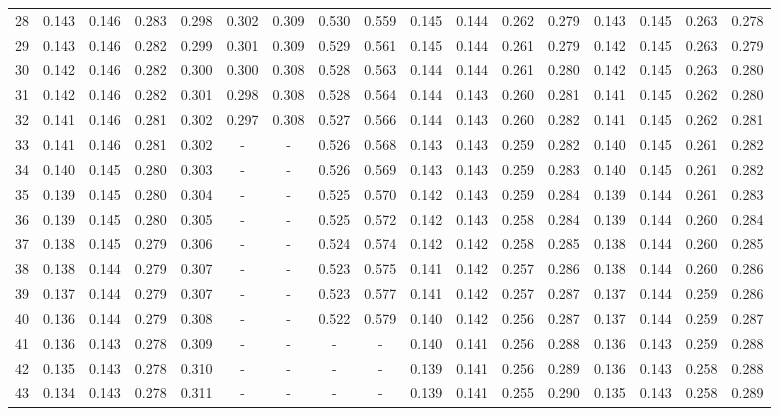 \documentclass{report}
\begin{document}
\begin{appendices}
\begin{table}
\begin{tabular}{|c|cccc|cccc|cccc|cccc|}
28 & 0.143 & 0.146 & 0.283 & 0.298 & 0.302 & 0.309 & 0.530 & 0.559 & 0.145 & 0.144 & 0.262 & 0.279 & 0.143 & 0.145 & 0.263 & 0.278\\
29 & 0.143 & 0.146 & 0.282 & 0.299 & 0.301 & 0.309 & 0.529 & 0.561 & 0.145 & 0.144 & 0.261 & 0.279 & 0.142 & 0.145 & 0.263 & 0.279\\
30 & 0.142 & 0.146 & 0.282 & 0.300 & 0.300 & 0.308 & 0.528 & 0.563 & 0.144 & 0.144 & 0.261 & 0.280 & 0.142 & 0.145 & 0.263 & 0.280\\
31 & 0.142 & 0.146 & 0.282 & 0.301 & 0.298 & 0.308 & 0.528 & 0.564 & 0.144 & 0.143 & 0.260 & 0.281 & 0.141 & 0.145 & 0.262 & 0.280\\
32 & 0.141 & 0.146 & 0.281 & 0.302 & 0.297 & 0.308 & 0.527 & 0.566 & 0.144 & 0.143 & 0.260 & 0.282 & 0.141 & 0.145 & 0.262 & 0.281\\
33 & 0.141 & 0.146 & 0.281 & 0.302 &   -   &   -   & 0.526 & 0.568 & 0.143 & 0.143 & 0.259 & 0.282 & 0.140 & 0.145 & 0.261 & 0.282\\
34 & 0.140 & 0.145 & 0.280 & 0.303 &   -   &   -   & 0.526 & 0.569 & 0.143 & 0.143 & 0.259 & 0.283 & 0.140 & 0.145 & 0.261 & 0.282\\
35 & 0.139 & 0.145 & 0.280 & 0.304 &   -   &   -   & 0.525 & 0.570 & 0.142 & 0.143 & 0.259 & 0.284 & 0.139 & 0.144 & 0.261 & 0.283\\
36 & 0.139 & 0.145 & 0.280 & 0.305 &   -   &   -   & 0.525 & 0.572 & 0.142 & 0.143 & 0.258 & 0.284 & 0.139 & 0.144 & 0.260 & 0.284\\
37 & 0.138 & 0.145 & 0.279 & 0.306 &   -   &   -   & 0.524 & 0.574 & 0.142 & 0.142 & 0.258 & 0.285 & 0.138 & 0.144 & 0.260 & 0.285\\
38 & 0.138 & 0.144 & 0.279 & 0.307 &   -   &   -   & 0.523 & 0.575 & 0.141 & 0.142 & 0.257 & 0.286 & 0.138 & 0.144 & 0.260 & 0.286\\
39 & 0.137 & 0.144 & 0.279 & 0.307 &   -   &   -   & 0.523 & 0.577 & 0.141 & 0.142 & 0.257 & 0.287 & 0.137 & 0.144 & 0.259 & 0.286\\
40 & 0.136 & 0.144 & 0.279 & 0.308 &   -   &   -   & 0.522 & 0.579 & 0.140 & 0.142 & 0.256 & 0.287 & 0.137 & 0.144 & 0.259 & 0.287\\
41 & 0.136 & 0.143 & 0.278 & 0.309 &   -   &   -   &   -   &   -   & 0.140 & 0.141 & 0.256 & 0.288 & 0.136 & 0.143 & 0.259 & 0.288\\
42 & 0.135 & 0.143 & 0.278 & 0.310 &   -   &   -   &   -   &   -   & 0.139 & 0.141 & 0.256 & 0.289 & 0.136 & 0.143 & 0.258 & 0.288\\
43 & 0.134 & 0.143 & 0.278 & 0.311 &   -   &   -   &   -   &   -   & 0.139 & 0.141 & 0.255 & 0.290 & 0.135 & 0.143 & 0.258 & 0.289\\

\end{tabular}
\end{table}
\end{appendices}
\end{document}
